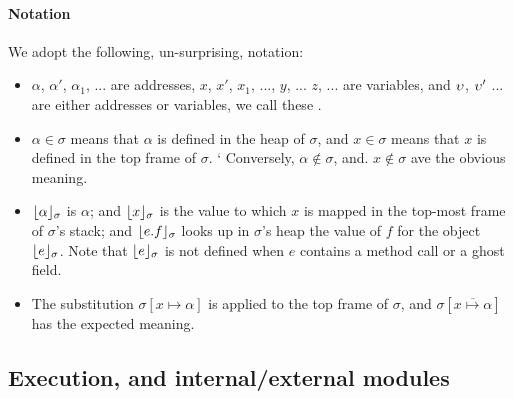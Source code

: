 \paragraph{Notation} We adopt the following, un-surprising, notation:
\begin{itemize}
\item
$\alpha$, $\alpha'$, $\alpha_1$, ... are addresses,   $x$, $x'$, $x_1$, ..., $y$, ... $z$, ... are variables, and $\upsilon$, $\upsilon'$ ... are either addresses or variables, we call these \emph{\atoms}.
\item
$\alpha \in \sigma$ means that $\alpha$ is defined in the heap of $\sigma$, and $x\in \sigma$ means that $x$ is defined in the top frame of $\sigma$.
`%
Conversely, %
 $\alpha\notin\sigma$, and. $x\notin\sigma$ %
 ave the obvious meaning.
\item
$\lfloor \alpha \rfloor_{\sigma}$  is $\alpha$; and $\lfloor x \rfloor_{\sigma}$  is the value to which  $x$  is mapped in the top-most frame of $\sigma$'s stack; 
and $\lfloor e.f \rfloor_{\sigma}$ looks up in $\sigma$'s heap the value of $f$ for the object  $\lfloor e \rfloor_{\sigma}$.
Note that $\lfloor e \rfloor_{\sigma}$ is not defined when $e$ contains a method call or a ghost field.
\item The substitution  $\sigma[x \mapsto \alpha]$ is applied to the top frame of $\sigma$, and $\sigma[\overline{x \mapsto \alpha}]$ %
has the expected meaning.
\end{itemize}

  
\newcommand{\Mext}{M_{extl}}
\newcommand{\Mint}{M\_{intl}}
\newcommand{\Mtwo}{\overline{M}}
  
\subsection{\LangOO Execution, and internal/external modules }
\label{sect:execution}

